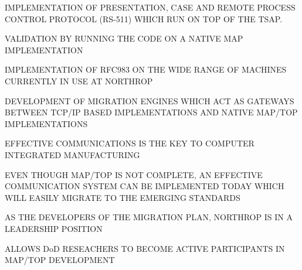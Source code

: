 \begin{bwslide}

\begin	{nrtc}
\item	IMPLEMENTATION OF PRESENTATION, CASE AND REMOTE PROCESS
	CONTROL PROTOCOL (RS-511) WHICH RUN ON TOP OF THE TSAP.
\item	VALIDATION BY RUNNING THE CODE ON A NATIVE MAP IMPLEMENTATION
\item	IMPLEMENTATION OF RFC983 ON THE WIDE RANGE OF MACHINES CURRENTLY
	IN USE AT NORTHROP
\item	DEVELOPMENT OF MIGRATION ENGINES WHICH ACT AS GATEWAYS BETWEEN
	TCP/IP BASED IMPLEMENTATIONS AND NATIVE MAP/TOP IMPLEMENTATIONS	
\end	{nrtc}
\end	{bwslide}

\begin{bwslide}
\vskip-0.5in
\end{bwslide}

\begin{bwslide}

\begin	{nrtc}
\item	EFFECTIVE COMMUNICATIONS IS THE KEY TO COMPUTER INTEGRATED
	MANUFACTURING
\item	EVEN THOUGH MAP/TOP IS NOT COMPLETE, AN EFFECTIVE COMMUNICATION
	SYSTEM CAN BE IMPLEMENTED TODAY WHICH
	WILL EASILY MIGRATE TO THE EMERGING STANDARDS
\item	AS THE DEVELOPERS OF THE MIGRATION PLAN, NORTHROP IS IN A LEADERSHIP
	POSITION
\item	ALLOWS DoD RESEACHERS TO BECOME ACTIVE PARTICIPANTS IN\\ MAP/TOP
	DEVELOPMENT
\end	{nrtc}
\end	{bwslide}


